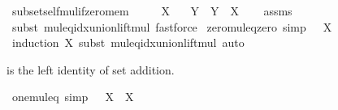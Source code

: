 \begin{isabellebody}
{\isafoldproof}%
%
\isadelimproof
\isanewline
%
\endisadelimproof
\isanewline
{}\isamarkupfalse%
\ subset{\isacharunderscore}{\kern0pt}self{\isacharunderscore}{\kern0pt}mul{\isacharunderscore}{\kern0pt}if{\isacharunderscore}{\kern0pt}zero{\isacharunderscore}{\kern0pt}mem{\isacharcolon}{\kern0pt}\isanewline
\ \ \ {\isachardoublequoteopen}{}\ {\isasymin}\ X{\isachardoublequoteclose}\isanewline
\ \ \ {\isachardoublequoteopen}Y\ {\isasymsubseteq}\ Y\ {\isacharasterisk}{\kern0pt}\ X{\isachardoublequoteclose}\isanewline
%
\isadelimproof
\ \ %
\endisadelimproof
%
\isatagproof
{}\isamarkupfalse%
\ assms\ \isamarkupfalse%
\ {\isacharparenleft}{\kern0pt}subst\ mul{\isacharunderscore}{\kern0pt}eq{\isacharunderscore}{\kern0pt}idx{\isacharunderscore}{\kern0pt}union{\isacharunderscore}{\kern0pt}lift{\isacharunderscore}{\kern0pt}mul{\isacharparenright}{\kern0pt}\ fastforce%
\endisatagproof
{\isafoldproof}%
%
\isadelimproof
%
\endisadelimproof
%
\isadelimdocument
%
\endisadelimdocument
%
\isatagdocument
%
\isamarkuptrue%
%
\endisatagdocument
{\isafolddocument}%
%
\isadelimdocument
%
\endisadelimdocument
{}\isamarkupfalse%
\ zero{\isacharunderscore}{\kern0pt}mul{\isacharunderscore}{\kern0pt}eq{\isacharunderscore}{\kern0pt}zero\ {\isacharbrackleft}{\kern0pt}simp{\isacharbrackright}{\kern0pt}{\isacharcolon}{\kern0pt}\ {\isachardoublequoteopen}{}\ {\isacharasterisk}{\kern0pt}\ X\ {\isacharequal}{\kern0pt}\ {}{\isachardoublequoteclose}\isanewline
%
\isadelimproof
\ \ %
\endisadelimproof
%
\isatagproof
{}\isamarkupfalse%
\ {\isacharparenleft}{\kern0pt}induction\ X{\isacharcomma}{\kern0pt}\ subst\ mul{\isacharunderscore}{\kern0pt}eq{\isacharunderscore}{\kern0pt}idx{\isacharunderscore}{\kern0pt}union{\isacharunderscore}{\kern0pt}lift{\isacharunderscore}{\kern0pt}mul{\isacharparenright}{\kern0pt}\ auto%
\endisatagproof
{\isafoldproof}%
%
\isadelimproof
%
\endisadelimproof
%
\begin{isamarkuptext}%
 is the left identity of set addition.%
\end{isamarkuptext}\isamarkuptrue%
\isamarkupfalse%
\ one{\isacharunderscore}{\kern0pt}mul{\isacharunderscore}{\kern0pt}eq\ {\isacharbrackleft}{\kern0pt}simp{\isacharbrackright}{\kern0pt}{\isacharcolon}{\kern0pt}\ {\isachardoublequoteopen}{}\ {\isacharasterisk}{\kern0pt}\ X\ {\isacharequal}{\kern0pt}\ X{\isachardoublequoteclose}\isanewline

\end{isabellebody}
